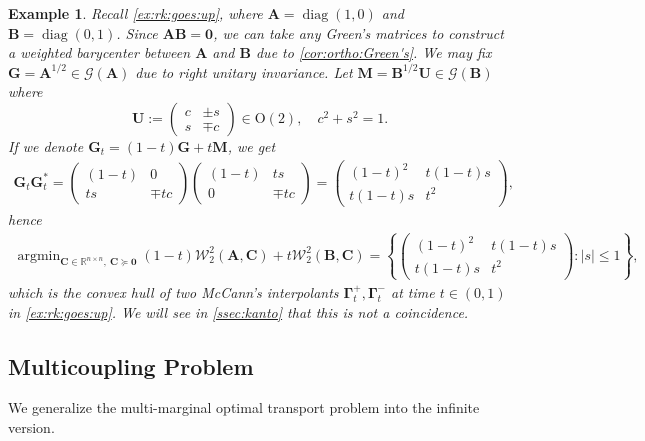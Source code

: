 \documentclass[noinfoline]{imsart}\setcounter{tocdepth}{2}
\renewcommand{\b}[1]{\mathbb{#1}} %
\newcommand{\m}[1]{\mathbf{#1}} %
\renewcommand{\c}[1]{\mathcal{#1}} %
\DeclareMathOperator*{\diag}{diag}
\DeclareMathOperator*{\argmin}{\arg\min}
\theoremstyle{plain}
\newtheorem{example}{Example}[section]
\begin{document}
\begin{example}\label{ex:midpoint:simple}
Recall \cref{ex:rk:goes:up}, where $\m{A} = \diag (1, 0)$ and $\m{B} = \diag (0, 1)$.
Since $\m{A} \m{B} = \m{0}$, we can take any Green's matrices to construct a weighted barycenter between $\m{A}$ and $\m{B}$ due to \cref{cor:ortho:Green's}. We may fix $\m{G} = \m{A}^{1/2} \in \c{G}(\m{A})$ due to right unitary invariance. Let $\m{M} = \m{B}^{1/2} \m{U} \in \c{G}(\m{B})$ where
\begin{equation*}
    \m{U} := \begin{pmatrix}
        c & \pm s \\
        s & \mp c
    \end{pmatrix} \in \mathrm{O}(2), \quad c^{2} + s^{2} = 1.
\end{equation*}
If we denote $\m{G}_{t} = (1-t) \m{G} + t \m{M}$, we get
\begin{align*}
    \m{G}_{t} \m{G}_{t}^{*} = \begin{pmatrix}
        (1-t) & 0 \\
        t s & \mp t c
    \end{pmatrix} \begin{pmatrix}
        (1-t) & t s \\
        0 & \mp t c
    \end{pmatrix} = \begin{pmatrix}
        (1-t)^{2} & t(1-t)s \\
        t(1-t)s & t^{2}
    \end{pmatrix},
\end{align*}
hence 
\begin{align*}
    \argmin_{\m{C} \in \b{R}^{n \times n}, \ \m{C} \succeq \m{0}}  (1-t) \c{W}_{2}^{2}(\m{A}, \m{C}) + t \c{W}_{2}^{2}(\m{B}, \m{C}) = \left\{ \begin{pmatrix}
        (1-t)^{2} & t(1-t)s \\
        t(1-t)s & t^{2}
    \end{pmatrix} : |s| \le 1 \right\},
\end{align*}
which is the convex hull of two McCann's interpolants $\m{\Gamma}_{t}^{+}, \m{\Gamma}_{t}^{-}$ at time $t \in (0, 1)$ in \cref{ex:rk:goes:up}. We will see in \cref{ssec:kanto} that this is not a coincidence.
\end{example}



\subsection{Multicoupling Problem}\label{ssec:multi:trans}
We generalize the multi-marginal optimal transport problem \cite{panaretos2020invitation, agueh2011barycenters} into the infinite version. 
\end{document}
